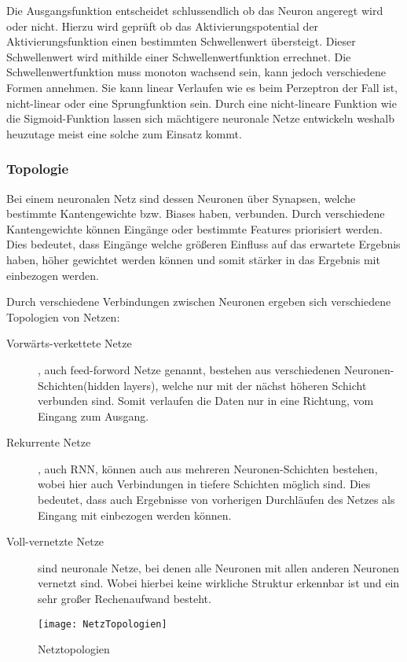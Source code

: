     \noindent
    Die Ausgangsfunktion entscheidet schlussendlich ob das Neuron angeregt wird oder nicht.
    Hierzu wird geprüft ob das Aktivierungspotential der Aktivierungsfunktion einen bestimmten Schwellenwert übersteigt.
    Dieser Schwellenwert wird mithilde einer Schwellenwertfunktion errechnet. 
    Die Schwellenwertfunktion muss monoton wachsend sein, kann jedoch verschiedene Formen annehmen. 
    Sie kann linear Verlaufen wie es beim Perzeptron der Fall ist, nicht-linear oder eine Sprungfunktion sein. 
    Durch eine nicht-lineare Funktion wie die Sigmoid-Funktion lassen sich mächtigere neuronale Netze entwickeln weshalb heuzutage meist eine solche zum Einsatz kommt.


    \subsubsection{Topologie}
    Bei einem neuronalen Netz sind dessen Neuronen über Synapsen, welche bestimmte Kantengewichte bzw. Biases haben, verbunden.
    Durch verschiedene Kantengewichte können Eingänge oder bestimmte Features priorisiert werden. 
    Dies bedeutet, dass Eingänge welche größeren Einfluss auf das erwartete Ergebnis haben, höher gewichtet werden können und somit stärker in das Ergebnis mit einbezogen werden.
    \newline

    \noindent
    Durch verschiedene Verbindungen zwischen Neuronen ergeben sich verschiedene Topologien von Netzen:
    \begin{description}
        \item[Vorwärts-verkettete Netze], auch feed-forword Netze genannt, bestehen aus verschiedenen Neuronen-Schichten(hidden layers), welche nur mit der nächst höheren Schicht verbunden sind. Somit verlaufen die Daten nur in eine Richtung, vom Eingang zum Ausgang.
        \item[Rekurrente Netze], auch \ac{RNN}, können auch aus mehreren Neuronen-Schichten bestehen, wobei hier auch Verbindungen in tiefere Schichten möglich sind. Dies bedeutet, dass auch Ergebnisse von vorherigen Durchläufen des Netzes als Eingang mit einbezogen werden können.
        \item[Voll-vernetzte Netze] sind neuronale Netze, bei denen alle Neuronen mit allen anderen Neuronen vernetzt sind. Wobei hierbei keine wirkliche Struktur erkennbar ist und ein sehr großer Rechenaufwand besteht.
    \end{description}

    \begin{figure}[H]
        \centering
        \texttt{[image: NetzTopologien]}
        \caption{Netztopologien \cite{DrawIO}}
        \label{fig:NetzTopologien}
    \end{figure}


